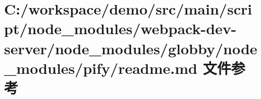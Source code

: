 \hypertarget{node__modules_2webpack-dev-server_2node__modules_2globby_2node__modules_2pify_2_r_e_a_d_m_e_8md}{}\section{C\+:/workspace/demo/src/main/script/node\+\_\+modules/webpack-\/dev-\/server/node\+\_\+modules/globby/node\+\_\+modules/pify/readme.md 文件参考}
\label{node__modules_2webpack-dev-server_2node__modules_2globby_2node__modules_2pify_2_r_e_a_d_m_e_8md}

